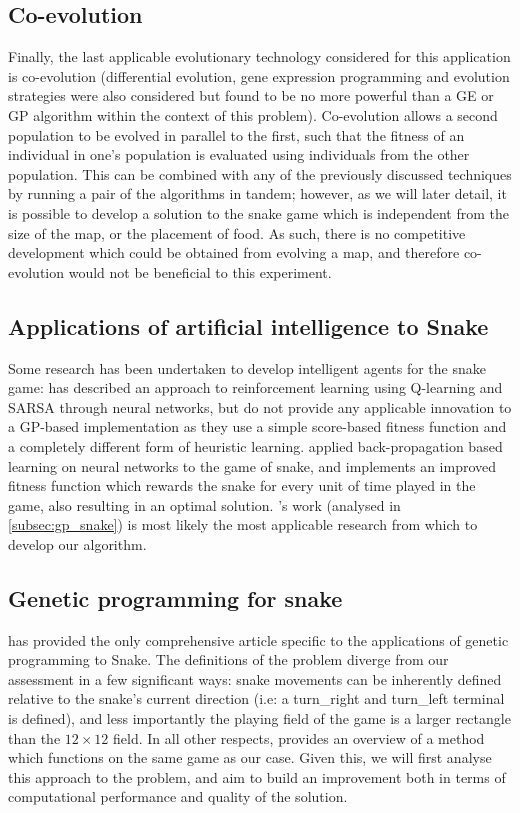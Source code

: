 \documentclass[british,10pt,a4paper]{article}
\begin{document}
\subsection{Co-evolution}
Finally, the last applicable evolutionary technology considered for this application is co-evolution (differential evolution, gene expression programming and evolution strategies were also considered but found to be no more powerful than a GE or GP algorithm within the context of this problem). Co-evolution allows a second population to be evolved in parallel to the first, such that the fitness of an individual in one's population is evaluated using individuals from the other population. This can be combined with any of the previously discussed techniques by running a pair of the algorithms in tandem; however, as we will later detail, it is possible to develop a solution to the snake game which is independent from the size of the map, or the placement of food. As such, there is no competitive development which could be obtained from evolving a map, and therefore co-evolution would not be beneficial to this experiment.


\subsection{Applications of artificial intelligence to Snake}
Some research has been undertaken to develop intelligent agents for the snake game: \citet{Bowei_Ma_undated-tl} has described an approach to reinforcement learning using Q-learning and SARSA through neural networks, but do not provide any applicable innovation to a GP-based implementation as they use a simple score-based fitness function and a completely different form of heuristic learning. \citet{Christopher_Lockhart2010-em} applied back-propagation based learning on neural networks to the game of snake, and implements an improved fitness function which rewards the snake for every unit of time played in the game, also resulting in an optimal solution. \citet{Ehlis2000-sz}'s work (analysed in \autoref{subsec:gp_snake}) is most likely the most applicable research from which to develop our algorithm.

\subsection{Genetic programming for snake}
\label{subsec:gp_snake}
\citet{Ehlis2000-sz} has provided the only comprehensive article specific to the applications of genetic programming to Snake. The definitions of the problem diverge from our assessment in a few significant ways: snake movements can be inherently defined relative to the snake's current direction (i.e: a turn\_right and turn\_left terminal is defined), and less importantly the playing field of the game is a larger rectangle than the $12\times12$ field. In all other respects, \citeauthor{Ehlis2000-sz} provides an overview of a method which functions on the same game as our case. Given this, we will first analyse this approach to the problem, and aim to build an improvement both in terms of computational performance and quality of the solution. 
\end{document}
